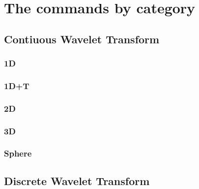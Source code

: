 \documentclass[12pt,a4paper]{article}
\begin{document}
\clearpage

%
%
\section{The commands by category}
\label{sec:ComCat}

\subsection{Contiuous Wavelet Transform}

\subsubsection{1D}






\subsubsection{1D+T}


 
\subsubsection{2D}



\subsubsection{3D}



\subsubsection{Sphere}




\subsection{Discrete Wavelet Transform}


% 
\end{document}
